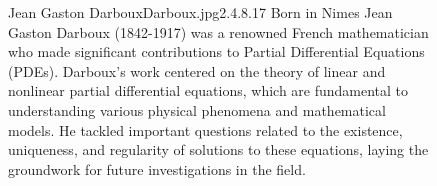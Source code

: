 \documentclass[]{article}
\begin{document}
\begin{figure}[b]
    \begin{enrichment}{Jean Gaston Darboux}{Darboux.jpg}{2.4}{.8}{.17}
        Born in Nimes Jean Gaston Darboux (1842-1917) was a renowned 
        French mathematician who made significant contributions to Partial Differential Equations (PDEs). 
        Darboux's work centered on the theory of linear and nonlinear partial differential equations, 
        which are fundamental to understanding various physical phenomena and mathematical models. 
        He tackled important questions related to the existence, uniqueness, and regularity of solutions to these equations, 
        laying the groundwork for future investigations in the field.
    \end{enrichment}    
\end{figure}

\newpage

\setcounter{equation}{0}
\setcounter{footnote}{0}
\end{document}
